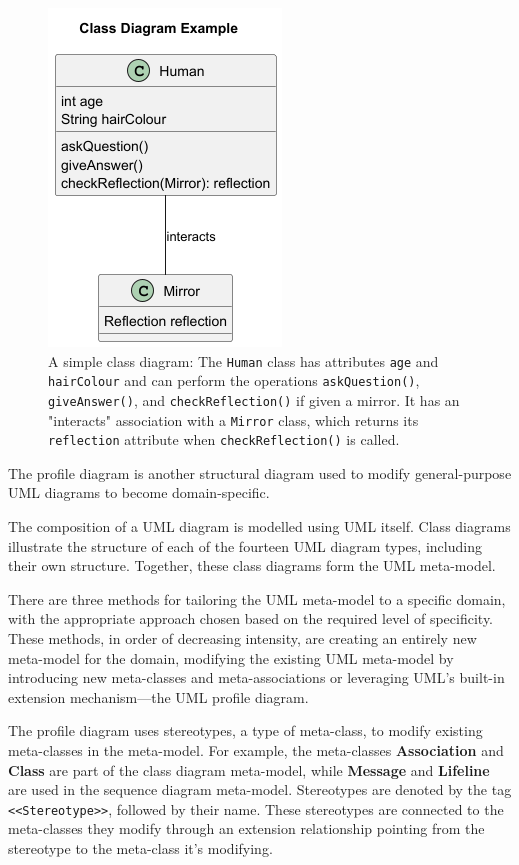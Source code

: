 \documentclass{article}
\newcounter{subsubsubsection}[subsubsection]
\begin{document}
{\begin{figure}[H]
    \centering
\includegraphics[width=0.4\linewidth]{CDexample-Class_Diagram_Example.png}
    \caption{A simple class diagram: The \texttt{Human} class has attributes \texttt{age} and \texttt{hairColour} and can perform the operations \texttt{askQuestion()}, \texttt{giveAnswer()}, and \texttt{checkReflection()} if given a mirror. It has an "interacts" association with a \texttt{Mirror} class, which returns its \texttt{reflection} attribute when \texttt{checkReflection()} is called.}
    \label{fig:Simple CD}
    \end{figure}


The profile diagram is another structural diagram used to modify general-purpose UML diagrams to become domain-specific.

The composition of a UML diagram is modelled using UML itself. Class diagrams illustrate the structure of each of the fourteen UML diagram types, including their own structure. Together, these class diagrams form the UML meta-model\cite{Seidl_Scholz_Huemer_Kappel_Duffy_2014}.

There are three methods for tailoring the UML meta-model to a specific domain, with the appropriate approach chosen based on the required level of specificity. These methods, in order of decreasing intensity, are creating an entirely new meta-model for the domain, modifying the existing UML meta-model by introducing new meta-classes and meta-associations or leveraging UML's built-in extension mechanism—the UML profile diagram\cite{Seidl_Scholz_Huemer_Kappel_Duffy_2014}.

The profile diagram uses stereotypes, a type of meta-class, to modify existing meta-classes in the meta-model. For example, the meta-classes \textbf{Association} and \textbf{Class} are part of the class diagram meta-model, while \textbf{Message} and \textbf{Lifeline} are used in the sequence diagram meta-model. Stereotypes are denoted by the tag \texttt{<<Stereotype>>}, followed by their name. These stereotypes are connected to the meta-classes they modify through an extension relationship pointing from the stereotype to the meta-class it's modifying\cite{Seidl_Scholz_Huemer_Kappel_Duffy_2014}.

}
\end{document}
